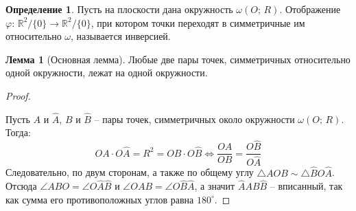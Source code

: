 \documentclass[12pt]{article}
\theoremstyle{definition}
\newtheorem{lemma}[theorem]{Лемма}
\newtheorem{definition}{Определение}
\newcommand{\R}{\mathbb{R}}
\begin{document}
    \begin{definition}
        Пусть на плоскости дана окружность $\omega(O;\,R)$. Отображение $\varphi:\,\R^2/\{0\}\longrightarrow \R^2/\{0\}$, при котором точки переходят в симметричные им относительно $\omega$, называется инверсией.
    \end{definition}
    \begin{lemma}[Основная лемма]
        Любые две пары точек, симметричных относительно одной окружности, лежат на одной окружности.
    \end{lemma}
    \begin{proof}
        $ $\par\nobreak\ignorespaces
        \begin{center}
        \end{center}
        Пусть $A$ и $\widehat{A}$, $B$ и $\widehat{B}$ -- пары точек, симметричных около окружности $\omega(O;\,R)$. Тогда:
        $$OA\cdot O\widehat{A}=R^2=OB\cdot O\widehat{B}\Longleftrightarrow \frac{OA}{OB}=\frac{O\widehat{B}}{O\widehat{A}}$$
        Следовательно, по двум сторонам, а также по общему углу $\triangle AOB \sim \triangle \widehat{B}O\widehat{A}$. Отсюда $\angle ABO=\angle O\widehat{A}\widehat{B}$ и $\angle OAB=\angle O\widehat{B}\widehat{A}$, а значит $\widehat{A}AB\widehat{B}$ -- вписанный, так как сумма его противоположных углов равна $180^{\circ}$.
    \end{proof}
\end{document}
